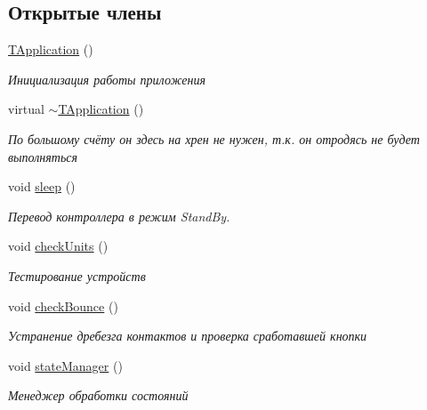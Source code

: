 \subsection*{Открытые члены}
\begin{DoxyCompactItemize}
\item 
\mbox{\label{classapp_1_1_t_application_ae9d037b0e6ebc6c26cd390ae9f5ff706}} 
\hyperlink{classapp_1_1_t_application_ae9d037b0e6ebc6c26cd390ae9f5ff706}{T\+Application} ()
\begin{DoxyCompactList}\small\item\em Инициализация работы приложения \end{DoxyCompactList}\item 
virtual \hyperlink{classapp_1_1_t_application_a5b7af31c95dab9a3f14ee792429a0737}{$\sim$\+T\+Application} ()
\begin{DoxyCompactList}\small\item\em По большому счёту он здесь на хрен не нужен, т.\+к. он отродясь не будет выполняться \end{DoxyCompactList}\item 
void \hyperlink{classapp_1_1_t_application_ab44dd5aa2afe1d66b2588e908bfad4d0}{sleep} ()
\begin{DoxyCompactList}\small\item\em Перевод контроллера в режим Stand\+By. \end{DoxyCompactList}\item 
void \hyperlink{classapp_1_1_t_application_acf71a4fe338cbc1e771cc9a60431c3bf}{check\+Units} ()
\begin{DoxyCompactList}\small\item\em Тестирование устройств \end{DoxyCompactList}\item 
void \hyperlink{classapp_1_1_t_application_a4c4d1d33ea8ab73ba49a59528d200501}{check\+Bounce} ()
\begin{DoxyCompactList}\small\item\em Устранение дребезга контактов и проверка сработавшей кнопки \end{DoxyCompactList}\item 
\mbox{\label{classapp_1_1_t_application_ae673484375cccb05d53f9f4cbeeba985}} 
void \hyperlink{classapp_1_1_t_application_ae673484375cccb05d53f9f4cbeeba985}{state\+Manager} ()
\begin{DoxyCompactList}\small\item\em Менеджер обработки состояний \end{DoxyCompactList}\item 

\end{DoxyCompactItemize}
